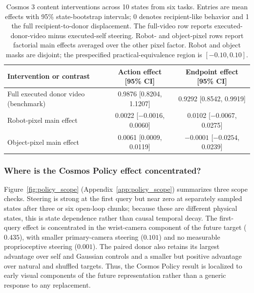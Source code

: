 \documentclass{article}
\begin{document}
\begin{table}[H]
  \caption{Cosmos 3 content interventions across 10 states from six tasks. Entries are mean effects with 95\% state-bootstrap intervals; 0 denotes recipient-like behavior and 1 the full recipient-to-donor displacement. The full-video row reports executed-donor-video minus executed-self steering. Robot- and object-pixel rows report factorial main effects averaged over the other pixel factor. Robot and object masks are disjoint; the prespecified practical-equivalence region is $[-0.10,0.10]$.}
  \label{tab:content_factors}
  \centering
  \footnotesize
  \setlength{\tabcolsep}{6pt}
  \begin{tabular}{@{}lcc@{}}
    \toprule
    Intervention or contrast & Action effect [95\% CI] & Endpoint effect [95\% CI] \\
    \midrule
    Full executed donor video (benchmark) & 0.9876 [0.8204, 1.1207] & 0.9292 [0.8542, 0.9919] \\
    Robot-pixel main effect & 0.0022 [$-0.0016$, 0.0060] & 0.0102 [$-0.0067$, 0.0275] \\
    Object-pixel main effect & 0.0061 [0.0009, 0.0119] & $-0.0001$ [$-0.0254$, 0.0239] \\
    \bottomrule
  \end{tabular}
\end{table}

\FloatBarrier
\subsubsection{Where is the Cosmos Policy effect concentrated?}
\label{sec:policy_scope}

Figure~\ref{fig:policy_scope} (Appendix~\ref{app:policy_scope}) summarizes three scope checks. Steering is strong at the first query but near zero at separately sampled states after three or six open-loop chunks; because these are different physical states, this is state dependence rather than causal temporal decay. The first-query effect is concentrated in the wrist-camera component of the future target ($0.435$), with smaller primary-camera steering ($0.101$) and no measurable proprioceptive steering ($0.001$). The paired donor also retains its largest advantage over self and Gaussian controls and a smaller but positive advantage over natural and shuffled targets. Thus, the Cosmos Policy result is localized to early visual components of the future representation rather than a generic response to any replacement.

\FloatBarrier
\end{document}
